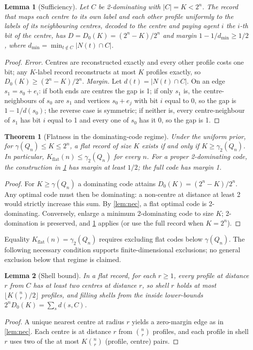 \documentclass[sigconf,anonymous,acmthm=false]{aamas}
\theoremstyle{acmplain}
\newtheorem{theorem}{Theorem}
\newtheorem{lemma}{Lemma}
\theoremstyle{acmdefinition}
\newcommand{\Kflat}{K_{\mathrm{flat}}}
\newcommand{\dmin}{d_{\min}}
\begin{document}
\begin{lemma}[Sufficiency]\label{lem:suff}
Let $C$ be 2-dominating with $|C|=K<2^n$. The record that maps each centre to its own label and
each other profile uniformly to the labels of its neighbouring centres, decoded to the centre
and paying agent $i$ the $i$-th bit of the centre, has $D=D_0(K)=(2^n-K)/2^n$ and margin
$1-1/\dmin\ge1/2$, where $\dmin=\min_{t\notin C}|N(t)\cap C|$.
\end{lemma}
\begin{proof}
\emph{Error.} Centres are reconstructed exactly and every other profile costs one bit; any
$K$-label record reconstructs at most $K$ profiles exactly, so $D_0(K)\ge(2^n-K)/2^n$.
\emph{Margin.} Let $d(t)=|N(t)\cap C|$. On an edge $s_1=s_0+e_i$: if both ends are centres the
gap is 1; if only $s_1$ is, the centre-neighbours of $s_0$ are $s_1$ and vertices $s_0+e_j$
with bit $i$ equal to 0, so the gap is $1-1/d(s_0)$; the reverse case is symmetric; if
neither is, every centre-neighbour of $s_1$ has bit $i$ equal to 1 and every one of $s_0$ has
it 0, so the gap is 1.
\end{proof}

\begin{theorem}[Flatness in the dominating-code regime]\label{thm:flat}
Under the uniform prior, for $\gamma(Q_n)\le K\le2^n$, a flat record of size $K$ exists
if and only if $K\ge\gamma_2(Q_n)$. In particular,
$\Kflat(n)\le\gamma_2(Q_n)$ for every $n$. For a proper 2-dominating code, the construction
in \cref{lem:suff} has margin at least $1/2$; the full code has margin 1.
\end{theorem}
\begin{proof}
For $K\ge\gamma(Q_n)$ a dominating code attains $D_0(K)=(2^n-K)/2^n$.
Any optimal code must then be dominating: a non-centre at distance at least 2 would
strictly increase this sum. By \cref{lem:nec}, a flat optimal code is 2-dominating.
Conversely, enlarge a minimum 2-dominating code to size $K$; 2-domination is preserved,
and \cref{lem:suff} applies (or use the full record when $K=2^n$).
\end{proof}

Equality $\Kflat(n)=\gamma_2(Q_n)$ requires excluding flat codes below $\gamma(Q_n)$.
The following necessary condition supports finite-dimensional exclusions; no general
exclusion below that regime is claimed.

\begin{lemma}[Shell bound]\label{lem:shell}
In a flat record, for each $r\ge1$, every profile at distance $r$ from $C$ has at least two centres at distance
$r$, so shell $r$ holds at most $\lfloor K\binom nr/2\rfloor$ profiles, and filling shells from
the inside lower-bounds $2^nD_0(K)=\sum_sd(s,C)$.
\end{lemma}
\begin{proof}
A unique nearest centre at radius $r$ yields a zero-margin edge as in \cref{lem:nec}. Each
centre is at distance $r$ from $\binom nr$ profiles, and each profile in shell $r$ uses two
of the at most $K\binom nr$ (profile, centre) pairs.
\end{proof}
\end{document}
